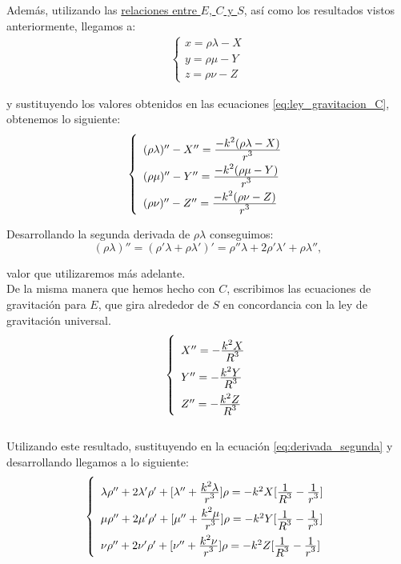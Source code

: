 \documentclass[11pt]{article}
\newcommand\ddfrac[2]{\frac{\displaystyle #1}{\displaystyle #2}}
\begin{document}
Además, utilizando las \hyperref[eq:terminologia]{relaciones entre $E$, $C$ y $S$}, así como los resultados vistos anteriormente, llegamos a:
\begin{align}
\left\{
\begin{array}{l}
	x=\rho\lambda-X\\
	y=\rho\mu-Y\\
	z=\rho\nu-Z
\end{array}
\right.
\label{eq:relacion_C_S_E}
\end{align}

\noindent y sustituyendo los valores obtenidos en las  ecuaciones \eqref{eq:ley_gravitacion_C}, obtenemos lo siguiente:
\begin{align}
\left\{
\def\arraystretch{2}
\begin{array}{l}
	(\rho\lambda)'' - X'' = \ddfrac{-k^2(\rho\lambda-X)}{r^3}\\
	(\rho\mu)'' - Y'' = \ddfrac{-k^2(\rho\mu-Y)}{r^3}\\
	(\rho\nu)'' - Z'' = \ddfrac{-k^2(\rho\nu-Z)}{r^3}
\end{array}
\right.
\label{eq:derivada_segunda}
\end{align}

Desarrollando la segunda derivada de $\rho\lambda$ conseguimos:
\[
(\rho\lambda)''=(\rho'\lambda+\rho\lambda')'=\rho''\lambda+2\rho'\lambda'+\rho\lambda'',
\]

\noindent valor que utilizaremos más adelante.\\

De la misma manera que hemos hecho con $C$, escribimos las ecuaciones de gravitación para $E$, que gira alrededor de $S$ en concordancia con la ley de gravitación universal.
\begin{align}
\left\{
\def\arraystretch{2}
\begin{array}{l}
	X'' = -\ddfrac{k^2X}{R^3}\\
	Y'' = -\ddfrac{k^2Y}{R^3}\\
	Z'' = -\ddfrac{k^2Z}{R^3}
\end{array}
\right.
\label{eq:ley_gravitacion_E}
\end{align}\\

Utilizando este resultado, sustituyendo en la ecuación \eqref{eq:derivada_segunda} y desarrollando llegamos a lo siguiente:
\begin{align}
\left\{
\def\arraystretch{2}
\begin{array}{l}
	\lambda\rho''+2\lambda'\rho'+[\lambda''+\ddfrac{k^2\lambda}{r^3}]\rho=-k^2X[\ddfrac{1}{R^3}-\ddfrac{1}{r^3}]\\
	\mu\rho''+2\mu'\rho'+[\mu''+\ddfrac{k^2\mu}{r^3}]\rho=-k^2Y[\ddfrac{1}{R^3}-\ddfrac{1}{r^3}]\\
	\nu\rho''+2\nu'\rho'+[\nu''+\ddfrac{k^2\nu}{r^3}]\rho=-k^2Z[\ddfrac{1}{R^3}-\ddfrac{1}{r^3}]
\end{array}
\right.
\label{eq:fundamental_equations}
\end{align}
\end{document}
